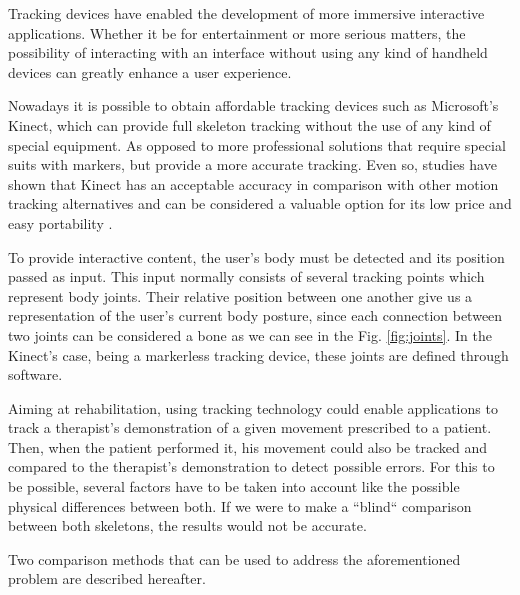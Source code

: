 Tracking devices have enabled the development of more immersive interactive applications.
Whether it be for entertainment or more serious matters, the possibility of interacting with 
an interface without using any kind of handheld devices can greatly enhance a user experience.

Nowadays it is possible to obtain affordable tracking devices such as Microsoft's Kinect, which 
can provide full skeleton tracking without the use of any kind of special equipment.
As opposed to more professional solutions that require special suits with markers, but provide a more accurate tracking. 
Even so, studies have shown that Kinect has an acceptable accuracy in comparison with other motion tracking alternatives 
and can be considered a valuable option for its low price and easy portability \cite{Scano2014,Chang2012a}.

To provide interactive content, the user's body must be detected and its position passed as input. This input normally consists of several tracking points which represent body joints. Their relative position between one another give us a representation of the user's current body posture, since each connection between two joints can be considered a bone as we can see in the 
Fig. \ref{fig:joints}.
In the Kinect's case, being a markerless tracking device, these joints are defined through software.


Aiming at rehabilitation, using tracking technology could enable applications to track a therapist's demonstration of a given movement prescribed to a patient.
Then, when the patient performed it, his movement could also be tracked and compared to the therapist's demonstration to detect possible errors.
For this to be possible, several factors have to be taken into account like the possible physical differences between both. If we were to make a ``blind`` comparison between both skeletons, the results would not be accurate.

Two comparison methods that can be used to address the aforementioned problem are described hereafter.

